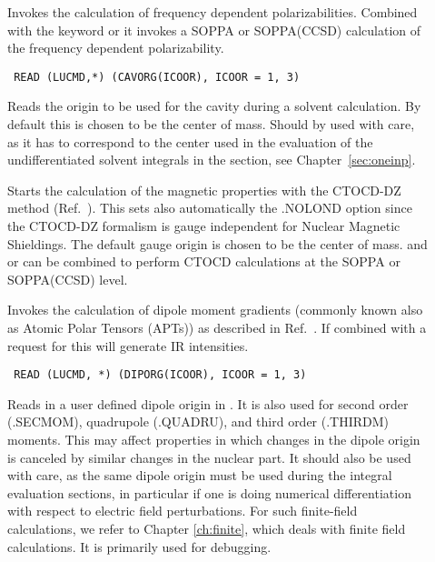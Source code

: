 \begin{description}

\item[] Invokes the calculation of frequency dependent
polarizabilities.
Combined with the keyword  or 
it invokes a SOPPA or SOPPA(CCSD)
 calculation of the frequency dependent polarizability.

\item[]\verb| |\newline
\verb|READ (LUCMD,*) (CAVORG(ICOOR), ICOOR = 1, 3)|

Reads the origin to be used for the cavity
during a solvent calculation. By default this is chosen to be the
center of mass. Should by used with care, as it
has to correspond to the center used in the evaluation of the
undifferentiated solvent integrals in the {\her} section, see Chapter~\ref{sec:oneinp}.

\item[] Starts the calculation of the magnetic properties with the
CTOCD-DZ method (Ref.~\cite{paololazz1,paololazz2,ctocd}). This sets also
automatically the .NOLOND option since the CTOCD-DZ formalism is gauge
independent for Nuclear Magnetic Shieldings. The default gauge origin is chosen to be
the center of mass.   and  or  can be combined to
perform CTOCD calculations at the SOPPA or SOPPA(CCSD) level.

\item[] Invokes the calculation of dipole moment
gradients
(commonly known also as Atomic Polar Tensors
(APTs)) as described in Ref.~\cite{tuhhjajpjjcp84}. If combined with a
request for  this will generate IR intensities.

\item[]\verb| |\newline
\verb|READ (LUCMD, *) (DIPORG(ICOOR), ICOOR = 1, 3)|

Reads in a user defined dipole origin
in \bohr{}. It is also used for second order (.SECMOM), quadrupole (.QUADRU),
and third order (.THIRDM) moments.  This may affect properties in
which changes in the dipole origin is canceled by
similar changes in the nuclear part.
It should also be used with care, as the same dipole
origin must be used during the integral evaluation sections, in
particular if one is doing numerical
differentiation with respect to electric field perturbations. For such
finite-field calculations, we refer to Chapter
\ref{ch:finite}, which deals with finite field calculations. It is
primarily used for debugging.


\end{description}
